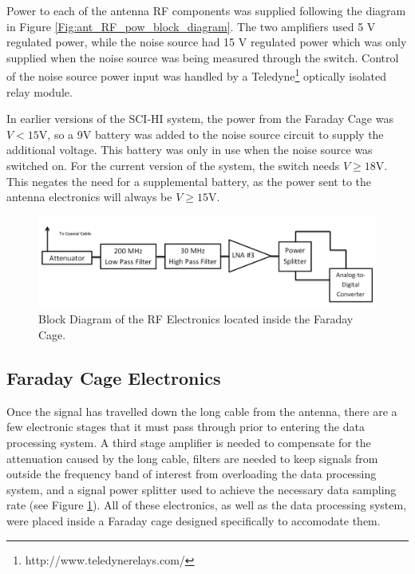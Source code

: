 Power to each of the antenna RF components was supplied following the diagram in Figure \ref{Fig:ant_RF_pow_block_diagram}. The two amplifiers used 5 V regulated power, while the noise source had 15 V regulated power which was only supplied when the noise source was being measured through the switch. Control of the noise source power input was handled by a Teledyne\footnote{http://www.teledynerelays.com/} optically isolated relay module. 

In earlier versions of the SCI-HI system, the power from the Faraday Cage was $V< 15$V, so a 9V battery was added to the noise source circuit to supply the additional voltage. This battery was only in use when the noise source was switched on. For the current version of the system, the switch needs $V \geq 18$V. This negates the need for a supplemental battery, as the power sent to the antenna electronics will always be $V \geq 15$V.  

\begin{figure}[htb]
\begin{center}
\includegraphics[width=0.9\linewidth]{SCIHI_system/figures/faraday_cage_rf_block_diagram.png}
\caption{Block Diagram of the RF Electronics located inside the Faraday Cage.}
\label{Fig:fcage_RF_block_diagram}
\end{center}
\end{figure}

\subsection{Faraday Cage Electronics}
Once the signal has travelled down the long cable from the antenna, there are a few electronic stages that it must pass through prior to entering the data processing system. A third stage amplifier is needed to compensate for the attenuation caused by the long cable, filters are needed to keep signals from outside the frequency band of interest from overloading the data processing system, and a signal power splitter used to achieve the necessary data sampling rate (see Figure \ref{Fig:fcage_RF_block_diagram}). All of these electronics, as well as the data processing system, were placed inside a Faraday cage designed specifically to accomodate them. 

